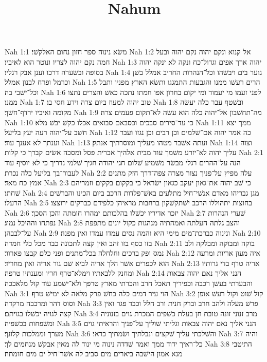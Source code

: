 

\title{Nahum}

Nah 1:1  משׂא נינוה ספר חזון נחום האלקשׁי׃
Nah 1:2  אל קנוא ונקם יהוה נקם יהוה ובעל חמה נקם יהוה לצריו ונוטר הוא לאיביו׃
Nah 1:3  יהוה ארך אפים וגדול־כח ונקה לא ינקה יהוה בסופה ובשׂערה דרכו וענן אבק רגליו׃
Nah 1:4  גוער בים ויבשׁהו וכל־הנהרות החריב אמלל בשׁן וכרמל ופרח לבנון אמלל׃
Nah 1:5  הרים רעשׁו ממנו והגבעות התמגגו ותשׂא הארץ מפניו ותבל וכל־ישׁבי בה׃
Nah 1:6  לפני זעמו מי יעמוד ומי יקום בחרון אפו חמתו נתכה כאשׁ והצרים נתצו ממנו׃
Nah 1:7  טוב יהוה למעוז ביום צרה וידע חסי בו׃
Nah 1:8  ובשׁטף עבר כלה יעשׂה מקומה ואיביו ירדף־חשׁך׃
Nah 1:9  מה־תחשׁבון אל־יהוה כלה הוא עשׂה לא־תקום פעמים צרה׃
Nah 1:10  כי עד־סירים סבכים וכסבאם סבואים אכלו כקשׁ יבשׁ מלא׃
Nah 1:11  ממך יצא חשׁב על־יהוה רעה יעץ בליעל׃
Nah 1:12  כה אמר יהוה אם־שׁלמים וכן רבים וכן נגזו ועבר וענתך לא אענך עוד׃
Nah 1:13  ועתה אשׁבר מטהו מעליך ומוסרתיך אנתק׃
Nah 1:14  וצוה עליך יהוה לא־יזרע משׁמך עוד מבית אלהיך אכרית פסל ומסכה אשׂים קברך כי קלות׃
Nah 2:1  הנה על־ההרים רגלי מבשׂר משׁמיע שׁלום חגי יהודה חגיך שׁלמי נדריך כי לא יוסיף עוד לעבור־בך בליעל כלה נכרת׃
Nah 2:2  עלה מפיץ על־פניך נצור מצרה צפה־דרך חזק מתנים אמץ כח מאד׃
Nah 2:3  כי שׁב יהוה את־גאון יעקב כגאון ישׂראל כי בקקום בקקים וזמריהם שׁחתו׃
Nah 2:4  מגן גבריהו מאדם אנשׁי־חיל מתלעים באשׁ־פלדות הרכב ביום הכינו והברשׁים הרעלו׃
Nah 2:5  בחוצות יתהוללו הרכב ישׁתקשׁקון ברחבות מראיהן כלפידם כברקים ירוצצו׃
Nah 2:6  יזכר אדיריו יכשׁלו בהלכותם ימהרו חומתה והכן הסכך׃
Nah 2:7  שׁערי הנהרות נפתחו וההיכל נמוג׃
Nah 2:8  והצב גלתה העלתה ואמהתיה מנהגות כקול יונים מתפפת על־לבבהן׃
Nah 2:9  ונינוה כברכת־מים מימי היא והמה נסים עמדו עמדו ואין מפנה׃
Nah 2:10  בזו כסף בזו זהב ואין קצה לתכונה כבד מכל כלי חמדה׃
Nah 2:11  בוקה ומבוקה ומבלקה ולב נמס ופק ברכים וחלחלה בכל־מתנים ופני כלם קבצו פארור׃
Nah 2:12  איה מעון אריות ומרעה הוא לכפרים אשׁר הלך אריה לביא שׁם גור אריה ואין מחריד׃
Nah 2:13  אריה טרף בדי גרותיו ומחנק ללבאתיו וימלא־טרף חריו ומענתיו טרפה׃
Nah 2:14  הנני אליך נאם יהוה צבאות והבערתי בעשׁן רכבה וכפיריך תאכל חרב והכרתי מארץ טרפך ולא־ישׁמע עוד קול מלאככה׃
Nah 3:1  הוי עיר דמים כלה כחשׁ פרק מלאה לא ימישׁ טרף׃
Nah 3:2  קול שׁוט וקול רעשׁ אופן וסוס דהר ומרכבה מרקדה׃
Nah 3:3  פרשׁ מעלה ולהב חרב וברק חנית ורב חלל וכבד פגר ואין קצה לגויה יכשׁלו בגויתם׃
Nah 3:4  מרב זנוני זונה טובת חן בעלת כשׁפים המכרת גוים בזנוניה ומשׁפחות בכשׁפיה׃
Nah 3:5  הנני אליך נאם יהוה צבאות וגליתי שׁוליך על־פניך והראיתי גוים מערך וממלכות קלונך׃
Nah 3:6  והשׁלכתי עליך שׁקצים ונבלתיך ושׂמתיך כראי׃
Nah 3:7  והיה כל־ראיך ידוד ממך ואמר שׁדדה נינוה מי ינוד לה מאין אבקשׁ מנחמים לך׃
Nah 3:8  התיטבי מנא אמון הישׁבה ביארים מים סביב לה אשׁר־חיל ים מים חומתה׃
